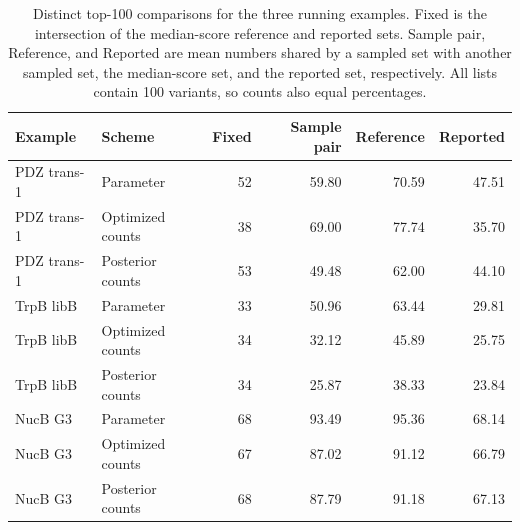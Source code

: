 \begingroup
\small
\setlength{\tabcolsep}{3pt}
\begin{table}[t]
\centering
\caption{Distinct top-100 comparisons for the three running examples. Fixed is the intersection of the median-score reference and reported sets. Sample pair, Reference, and Reported are mean numbers shared by a sampled set with another sampled set, the median-score set, and the reported set, respectively. All lists contain 100 variants, so counts also equal percentages.}
\label{tab:reference-comparisons}
\begin{tabular}{llrrrr}
\toprule
Example & Scheme & Fixed & Sample pair & Reference & Reported \\
\midrule
PDZ trans-1 & Parameter & 52 & 59.80 & 70.59 & 47.51 \\
PDZ trans-1 & Optimized counts & 38 & 69.00 & 77.74 & 35.70 \\
PDZ trans-1 & Posterior counts & 53 & 49.48 & 62.00 & 44.10 \\
TrpB libB & Parameter & 33 & 50.96 & 63.44 & 29.81 \\
TrpB libB & Optimized counts & 34 & 32.12 & 45.89 & 25.75 \\
TrpB libB & Posterior counts & 34 & 25.87 & 38.33 & 23.84 \\
NucB G3 & Parameter & 68 & 93.49 & 95.36 & 68.14 \\
NucB G3 & Optimized counts & 67 & 87.02 & 91.12 & 66.79 \\
NucB G3 & Posterior counts & 68 & 87.79 & 91.18 & 67.13 \\
\bottomrule
\end{tabular}
\end{table}
\endgroup
